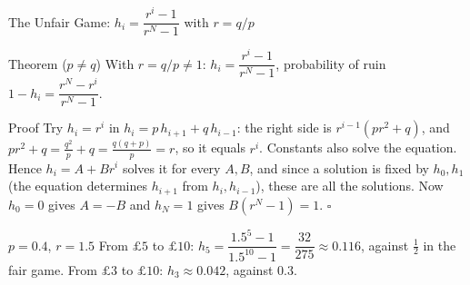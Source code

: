 \begin{frame}{The Unfair Game: $h_i=\dfrac{r^i-1}{r^N-1}$ with $r=q/p$}
  \label{fr:ruinunfair}
  \small
  \begin{block}{Theorem ($p\ne q$)}
    With $r=q/p\ne1$: \quad $h_i=\dfrac{r^i-1}{r^N-1}$, \quad probability of ruin $1-h_i=\dfrac{r^N-r^i}{r^N-1}$.
  \end{block}
  \begin{block}{Proof}
    Try $h_i=r^i$ in $h_i=p\,h_{i+1}+q\,h_{i-1}$: the right side is $r^{i-1}(pr^2+q)$, and $pr^2+q=\tfrac{q^2}{p}+q=\tfrac{q(q+p)}{p}=r$, so it equals $r^i$. Constants also solve the equation. Hence $h_i=A+Br^i$ solves it for every $A,B$, and since a solution is fixed by $h_0,h_1$ (the equation determines $h_{i+1}$ from $h_i,h_{i-1}$), these are all the solutions. Now $h_0=0$ gives $A=-B$ and $h_N=1$ gives $B(r^N-1)=1$. \hfill$\square$
  \end{block}
  \begin{exampleblock}{$p=0.4$, $r=1.5$}
    From $\pounds5$ to $\pounds10$: $h_5=\dfrac{1.5^5-1}{1.5^{10}-1}=\dfrac{32}{275}\approx0.116$, against $\tfrac12$ in the fair game. From $\pounds3$ to $\pounds10$: $h_3\approx0.042$, against $0.3$.
  \end{exampleblock}
\end{frame}


